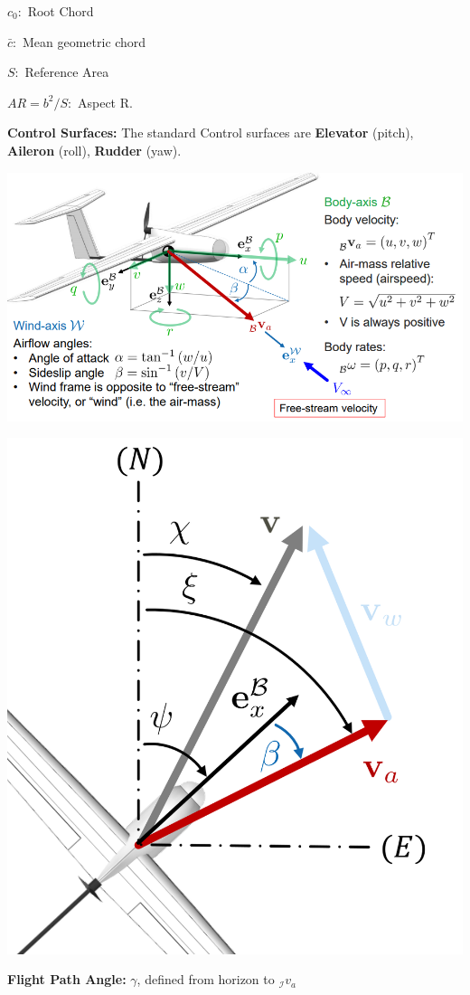 \documentclass[fontsize=6pt,DIV=calc,a4paper,ngerman]{scrartcl}
\begin{document}
\begin{multicols*}{4}
\begin{minipage}{0.4\linewidth}
		$c_0:$ Root Chord

		$\bar{c}: $ Mean geometric chord

		$S:$ Reference Area

		$AR = b^2 / S:$ Aspect R.
	\end{minipage}


	\textbf{Control Surfaces:} The standard Control surfaces are \textbf{Elevator} (pitch), \textbf{Aileron} (roll), \textbf{Rudder} (yaw).

	\includegraphics[width=0.8\linewidth]{Fixedwing_kin.png}\\
    
    \begin{minipage}{0.35\linewidth}
		\includegraphics[width=\linewidth]{angles.png}
	\end{minipage}\hfill
	\begin{minipage}{0.6\linewidth}
	    \textbf{Flight Path Angle:} $\gamma$, defined from horizon to ${}_\mathcal{I}v_a$
        

\end{minipage}
\end{multicols*}
\end{document}
